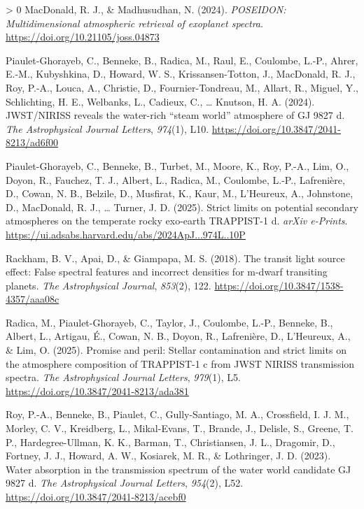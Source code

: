 \documentclass[10pt,a4paper,onecolumn]{article}
\newlength{\cslhangindent}
\newenvironment{CSLReferences}[3] %
 {%
  \setlength{\parindent}{0pt}
  \ifodd #1 \everypar{\setlength{\hangindent}{\cslhangindent}}\ignorespaces\fi
  \ifnum #2 > 0
  \setlength{\parskip}{#2\baselineskip}
  \fi
 }%
 {}
\begin{document}
\begin{CSLReferences}{1}{0}
\leavevmode\hypertarget{ref-poseidon}{}%
MacDonald, R. J., \& Madhusudhan, N. (2024). \emph{POSEIDON:
Multidimensional atmospheric retrieval of exoplanet spectra}.
\url{https://doi.org/10.21105/joss.04873}

\leavevmode\hypertarget{ref-PiauletGhorayeb:2024}{}%
Piaulet-Ghorayeb, C., Benneke, B., Radica, M., Raul, E., Coulombe,
L.-P., Ahrer, E.-M., Kubyshkina, D., Howard, W. S., Krissansen-Totton,
J., MacDonald, R. J., Roy, P.-A., Louca, A., Christie, D.,
Fournier-Tondreau, M., Allart, R., Miguel, Y., Schlichting, H. E.,
Welbanks, L., Cadieux, C., \ldots{} Knutson, H. A. (2024). JWST/NIRISS
reveals the water-rich {``steam world''} atmosphere of GJ 9827 d.
\emph{The Astrophysical Journal Letters}, \emph{974}(1), L10.
\url{https://doi.org/10.3847/2041-8213/ad6f00}

\leavevmode\hypertarget{ref-PiauletGhorayeb:2025}{}%
Piaulet-Ghorayeb, C., Benneke, B., Turbet, M., Moore, K., Roy, P.-A.,
Lim, O., Doyon, R., Fauchez, T. J., Albert, L., Radica, M., Coulombe,
L.-P., Lafrenière, D., Cowan, N. B., Belzile, D., Musfirat, K., Kaur,
M., L'Heureux, A., Johnstone, D., MacDonald, R. J., \ldots{} Turner, J.
D. (2025). Strict limits on potential secondary atmospheres on the
temperate rocky exo-earth TRAPPIST-1 d. \emph{arXiv e-Prints}.
\url{https://ui.adsabs.harvard.edu/abs/2024ApJ...974L..10P}

\leavevmode\hypertarget{ref-Rackham:2018}{}%
Rackham, B. V., Apai, D., \& Giampapa, M. S. (2018). The transit light
source effect: False spectral features and incorrect densities for
m-dwarf transiting planets. \emph{The Astrophysical Journal},
\emph{853}(2), 122. \url{https://doi.org/10.3847/1538-4357/aaa08c}

\leavevmode\hypertarget{ref-Radica:2025}{}%
Radica, M., Piaulet-Ghorayeb, C., Taylor, J., Coulombe, L.-P., Benneke,
B., Albert, L., Artigau, É., Cowan, N. B., Doyon, R., Lafrenière, D.,
L'Heureux, A., \& Lim, O. (2025). Promise and peril: Stellar
contamination and strict limits on the atmosphere composition of
TRAPPIST-1 c from JWST NIRISS transmission spectra. \emph{The
Astrophysical Journal Letters}, \emph{979}(1), L5.
\url{https://doi.org/10.3847/2041-8213/ada381}

\leavevmode\hypertarget{ref-Roy:2023}{}%
Roy, P.-A., Benneke, B., Piaulet, C., Gully-Santiago, M. A., Crossfield,
I. J. M., Morley, C. V., Kreidberg, L., Mikal-Evans, T., Brande, J.,
Delisle, S., Greene, T. P., Hardegree-Ullman, K. K., Barman, T.,
Christiansen, J. L., Dragomir, D., Fortney, J. J., Howard, A. W.,
Kosiarek, M. R., \& Lothringer, J. D. (2023). Water absorption in the
transmission spectrum of the water world candidate GJ 9827 d. \emph{The
Astrophysical Journal Letters}, \emph{954}(2), L52.
\url{https://doi.org/10.3847/2041-8213/acebf0}


\end{CSLReferences}
\end{document}
